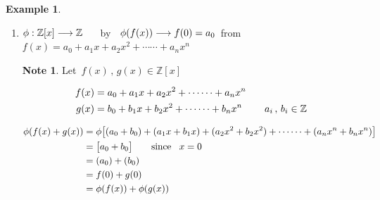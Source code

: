 \documentclass[11pt,a4paper]{article}
\theoremstyle{definition}
\newtheorem{exa}[thm]{Example}
\newtheorem*{note}{Note}
\begin{document}
\begin{exa}
\begin{enumerate}
$\phi\, $ is indeed a ring homomorphism.\\



Check if $1-1\, / $ onto. If $\phi (a)  = \phi (b)$. Then $\begin{pmatrix}
0 & 0\\
a & a\\
\end{pmatrix}  = \begin{pmatrix}
0 & 0\\
b & b\\
\end{pmatrix}\implies a = b$. Thus $\phi$ is injection and  $\hspace{0.3cm} \forall\, \begin{pmatrix}
0 & 0\\
a & a\\
\end{pmatrix} \in M_2(\mathbb{Z})\, \exists \, a\in \mathbb{Z}\ni \phi (a) = \begin{pmatrix}
0 & 0\\
a & a\\
\end{pmatrix}$. Thus onto.\\\\



\item $\phi : \mathbb{Z}[x]\longrightarrow \mathbb{Z}\hspace{0.5cm}$ by $\hspace{0.2cm} \phi(f(x))\longrightarrow f(0) = a_0\,$ from $f(x) = a_0 + a_1 x + a_2 x^2 + \cdots\cdots + a_nx^n$\\


\begin{note}
Let $\, f(x)\, , \, g(x)\in \mathbb{Z}[x]$
\end{note}
\begin{align*}
f(x) & = a_0 + a_1x + a_2 x^2 + \cdots\cdots + a_n x^n\\
g(x) & = b_0 + b_1x + b_2 x^2 + \cdots\cdots + b_n x^n\hspace{0.8cm} a_i\, , \, b_i\in \mathbb{Z}
\end{align*}


\begin{align*}
\phi (f(x) + g(x)) & = \phi \big[(a_0 + b_0) + (a_1x + b_1x) + (a_2x^2  + b_2x^2) + \cdots\cdots + (a_nx^n + b_nx^n)\big]\\
& = \big[a_0 + b_0\big]\hspace{.7cm} \text{since}\hspace{0.3cm} x = 0\\
& = (a_0) + (b_0)\\
& = f(0) + g(0)\\
& = \phi (f(x)) + \phi (g(x))
\end{align*}


\end{enumerate}
\end{exa}
\end{document}
